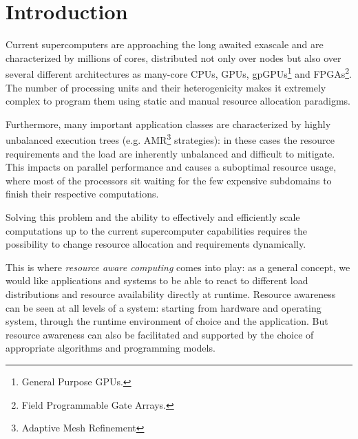 
\section{Introduction}

Current supercomputers are approaching the long awaited exascale and are characterized by millions of cores, distributed not only over nodes but also over several different architectures as many-core CPUs, GPUs, gpGPUs\footnote{General Purpose GPUs.} and FPGAs\footnote{Field Programmable Gate Arrays.}.
The number of processing units and their heterogenicity makes it extremely complex to program them using static and manual resource allocation paradigms.

Furthermore, many important application classes are characterized by highly unbalanced execution trees (e.g. AMR\footnote{Adaptive Mesh Refinement} strategies): in these cases the resource requirements and the load are inherently unbalanced and difficult to mitigate.
This impacts on parallel performance and causes a suboptimal resource usage, where most of the processors sit waiting for the few expensive subdomains to finish their respective computations.

Solving this problem and the ability to effectively and efficiently scale computations up to the current supercomputer capabilities requires the possibility to change resource allocation and requirements dynamically.

This is where \emph{resource aware computing} comes into play: as a general concept, we would like applications and systems to be able to react to different load distributions and resource availability directly at runtime. Resource awareness can be seen at all levels of a system: starting from hardware and operating system, through the runtime environment of choice and the application. But resource awareness can also be facilitated and supported by the choice of appropriate algorithms and programming models.

